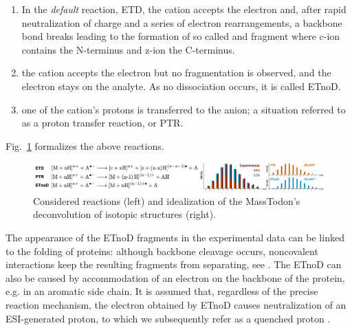 \documentclass{llncs}
\begin{document}
        \begin{enumerate}
                \item In the \textit{default} reaction, ETD, the cation accepts the electron and, after rapid neutralization of charge and a series of electron rearrangements, a backbone  bond breaks leading to the formation of so called  and  fragment where c-ion contains the N-terminus and z-ion the C-terminus.

                \item the cation accepts the electron but no fragmentation is observed, and the electron stays on the analyte. As no dissociation occurs, it is called ETnoD.

                \item one of the cation’s protons is transferred to the anion; a situation referred to as a proton transfer reaction, or PTR.
        \end{enumerate}
        Fig.~\ref{img::reactionsMassTodon} formalizes the above reactions.

        \begin{figure}[h]
                \includegraphics[width=\textwidth]{reactionMassTodon.png}
                \caption{Considered reactions (left) and idealization of the MassTodon's deconvolution of isotopic structures (right).}\label{img::reactionsMassTodon}
        \end{figure}



        The appearance of the ETnoD fragments in the experimental data can be linked to the folding of proteins: although backbone cleavage occurs, noncovalent interactions keep the resulting fragments from separating, see \cite{Lermyte2014-vu,Lermyte2015-oy}. The ETnoD can also be caused by accommodation of an electron on the backbone of the protein, e.g. in an aromatic side chain. It is assumed that, regardless of the precise reaction mechanism, the electron obtained by ETnoD causes neutralization of an ESI-generated proton, to which we subsequently refer as a quenched proton \cite{Lermyte2015-lm}.
\end{document}
